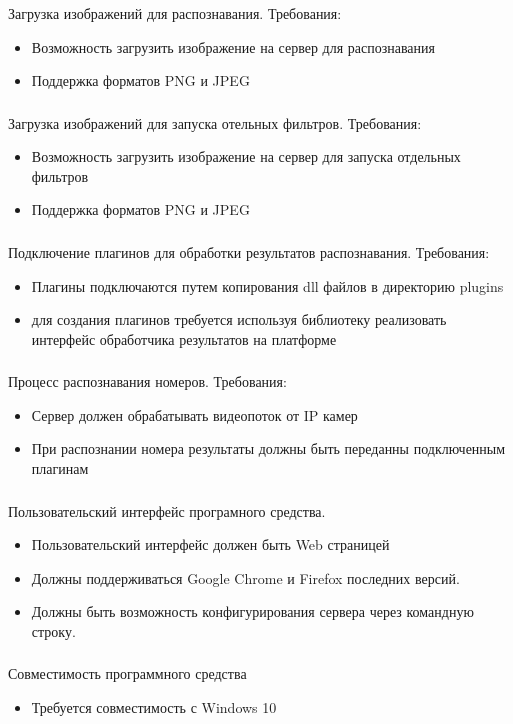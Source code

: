 \subsubsection{}
Загрузка изображений для распознавания. Требования:
\begin{itemize}
	\item Возможность загрузить изображение на сервер для распознавания
	\item Поддержка форматов PNG и JPEG
\end{itemize}

\subsubsection{}
Загрузка изображений для запуска отельных фильтров. Требования:
\begin{itemize}
	\item Возможность загрузить изображение на сервер для запуска отдельных фильтров
	\item Поддержка форматов PNG и JPEG
\end{itemize}

\subsubsection{}
Подключение плагинов для обработки результатов распознавания. Требования:
\begin{itemize}
	\item Плагины подключаются путем копирования dll файлов в директорию plugins
	\item для создания плагинов требуется используя библиотеку реализовать интерфейс обработчика результатов на платформе \dotnet{}
\end{itemize}

\subsubsection{}
Процесс распознавания номеров. Требования:
\begin{itemize}
	\item Сервер должен обрабатывать видеопоток от IP камер
	\item При распознании номера результаты должны быть переданны подключенным плагинам
\end{itemize}

\subsubsection{}
Пользовательский интерфейс програмного средства.
\begin{itemize}
	\item Пользовательский интерфейс должен быть Web страницей
	\item Должны поддерживаться Google Chrome и Firefox последних версий.
	\item Должны быть возможность конфигурирования сервера через командную строку.
\end{itemize}

\subsubsection{}
Совместимость программного средства
\begin{itemize}
	\item Требуется совместимость с Windows 10
\end{itemize}